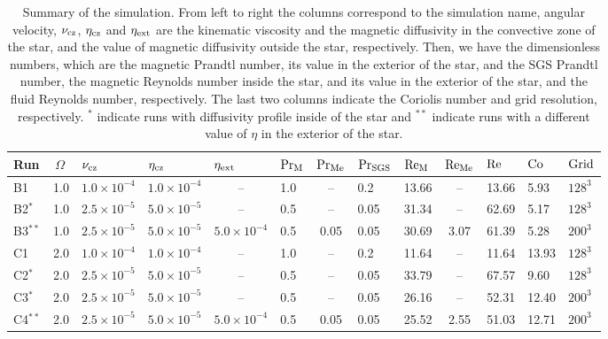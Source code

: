 \documentclass[baaa]{baaa}
\begin{document}
\begin{table*}[t!]
    \caption{Summary of the simulation. From left to right the columns correspond to the simulation name, angular velocity, $\nu_{\rm cz}$, $\eta_{\rm cz}$ and $\eta_{\rm ext}$ are the kinematic viscosity and the magnetic diffusivity in the convective zone of the star, and the value of magnetic diffusivity outside the star, respectively. Then, we have the dimensionless numbers, which are the magnetic Prandtl number, its value in the exterior of the star, and the SGS Prandtl number, the magnetic Reynolds number inside the star, and its value in the exterior of the star, and the fluid Reynolds number, respectively. The last two columns indicate the Coriolis number and grid resolution, respectively. $^*$ indicate runs with diffusivity profile inside of the star and $^{**}$ indicate runs with a different value of $\eta$ in the exterior of the star.}
    \label{tabla}
    \centering
    \begin{tabular}{llllclcllclll}
    \hline\hline\noalign{\smallskip}
     Run &\,$\Omega$ & \;\;\;\;\;$\nu_{\rm cz}$ & \;\;\;\;\;$\eta_{\rm cz}$ & \multicolumn{1}{l}{\;\;\;\;$\eta_{\rm ext}$} & $\rm Pr_{M}$ & \multicolumn{1}{l}{$\rm Pr_{\rm{Me}}$} & $\rm Pr_{\rm SGS}$ & $\rm Re_{M}$ & \multicolumn{1}{l}{$\rm Re_{\rm{Me}}$} & $\rm Re $& $\rm Co$ & $\rm Grid$\\
     \hline\noalign{\smallskip}
     B1 & 1.0 & $1.0 \times 10^{-4}$ & $1.0 \times 10^{-4}$ & -- &1.0 & -- & 0.2 & 13.66 & -- & 13.66 & 5.93 & $128^3$\\
     B2$^*$ & 1.0 & $2.5 \times 10^{-5}$ & $5.0 \times 10^{-5}$ & -- & 0.5 & -- & 0.05 & 31.34 & -- & 62.69 & 5.17 & $128^3$\\ 
     B3$^{**}$ & 1.0 & $2.5 \times 10^{-5}$ & $5.0 \times 10^{-5}$ & $5.0\times 10^{-4}$ & 0.5 & 0.05 & 0.05 & 30.69 & 3.07 & 61.39 & 5.28 & $200^3$\\ \hline\noalign{\smallskip}
     C1 & 2.0 & $1.0 \times 10^{-4}$ & $1.0 \times 10^{-4}$ & -- & 1.0 & -- & 0.2 & 11.64 & -- & 11.64 & 13.93 & $128^3$\\
     C2$^*$ & 2.0 & $2.5 \times 10^{-5}$ & $5.0 \times 10^{-5}$ & -- & 0.5 & -- & 0.05 & 33.79 & -- & 67.57 & 9.60 & $128^3$\\
     C3$^*$ & 2.0 & $2.5 \times 10^{-5}$ & $5.0 \times 10^{-5}$ & -- & 0.5 & -- & 0.05 & 26.16 & -- & 52.31 & 12.40 & $200^3$\\
     C4$^{**}$ & 2.0 & $2.5 \times 10^{-5}$ & $5.0 \times 10^{-5}$ & $5.0\times 10^{-4}$ & 0.5 & 0.05 & 0.05 & 25.52 & 2.55 & 51.03 & 12.71 & $200^3$\\

\end{tabular}
\end{table*}
\end{document}
